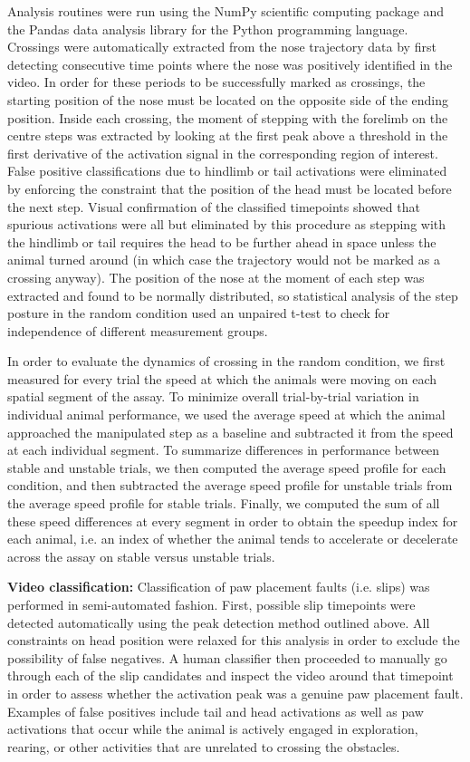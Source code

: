 Analysis routines were run using the NumPy scientific computing package \cite{Walt2011} and the Pandas data analysis library \cite{McKinney2010} for the Python programming language. Crossings were automatically extracted from the nose trajectory data by first detecting consecutive time points where the nose was positively identified in the video. In order for these periods to be successfully marked as crossings, the starting position of the nose must be located on the opposite side of the ending position. Inside each crossing, the moment of stepping with the forelimb on the centre steps was extracted by looking at the first peak above a threshold in the first derivative of the activation signal in the corresponding region of interest. False positive classifications due to hindlimb or tail activations were eliminated by enforcing the constraint that the position of the head must be located before the next step. Visual confirmation of the classified timepoints showed that spurious activations were all but eliminated by this procedure as stepping with the hindlimb or tail requires the head to be further ahead in space unless the animal turned around (in which case the trajectory would not be marked as a crossing anyway). The position of the nose at the moment of each step was extracted and found to be normally distributed, so statistical analysis of the step posture in the random condition used an unpaired t-test to check for independence of different measurement groups.

In order to evaluate the dynamics of crossing in the random condition, we first measured for every trial the speed at which the animals were moving on each spatial segment of the assay. To minimize overall trial-by-trial variation in individual animal performance, we used the average speed at which the animal approached the manipulated step as a baseline and subtracted it from the speed at each individual segment. To summarize differences in performance between stable and unstable trials, we then computed the average speed profile for each condition, and then subtracted the average speed profile for unstable trials from the average speed profile for stable trials. Finally, we computed the sum of all these speed differences at every segment in order to obtain the speedup index for each animal, i.e. an index of whether the animal tends to accelerate or decelerate across the assay on stable versus unstable trials.

\textbf{Video classification:} Classification of paw placement faults (i.e. slips) was performed in semi-automated fashion. First, possible slip timepoints were detected automatically using the peak detection method outlined above. All constraints on head position were relaxed for this analysis in order to exclude the possibility of false negatives. A human classifier then proceeded to manually go through each of the slip candidates and inspect the video around that timepoint in order to assess whether the activation peak was a genuine paw placement fault. Examples of false positives include tail and head activations as well as paw activations that occur while the animal is actively engaged in exploration, rearing, or other activities that are unrelated to crossing the obstacles.

